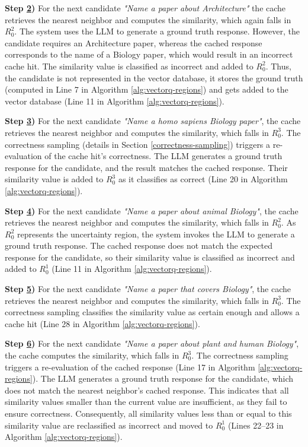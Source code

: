 \textbf{Step \hyperref[fig:vectorq-threshold-regions]{2})} For the next candidate \textit{"Name a paper about Architecture"} the cache retrieves the nearest neighbor and computes the similarity, which again falls in $R_0^2$. The system uses the LLM to generate a ground truth response. However, the candidate requires an Architecture paper, whereas the cached response corresponds to the name of a Biology paper, which would result in an incorrect cache hit. The similarity value is classified as incorrect and added to $R_0^2$. Thus, the candidate is not represented in the vector database, it stores the ground truth (computed in Line 7 in Algorithm \ref{alg:vectorq-regions}) and gets added to the vector database (Line 11 in Algorithm \ref{alg:vectorq-regions}). 

\textbf{Step \hyperref[fig:vectorq-threshold-regions]{3})} For the next candidate \textit{"Name a homo sapiens Biology paper"}, the cache retrieves the nearest neighbor and computes the similarity, which falls in $R_0^3$. The correctness sampling (details in Section \ref{correctness-sampling}) triggers a re-evaluation of the cache hit's correctness. The LLM generates a ground truth response for the candidate, and the result matches the cached response. Their similarity value is added to $R_0^3$ as it classifies as correct (Line 20 in Algorithm \ref{alg:vectorq-regions}).

\textbf{Step \hyperref[fig:vectorq-threshold-regions]{4})} For the next candidate \textit{"Name a paper about animal Biology"}, the cache retrieves the nearest neighbor and computes the similarity, which falls in $R_0^2$. As $R_0^2$ represents the uncertainty region, the system invokes the LLM to generate a ground truth response. The cached response does not match the expected response for the candidate, so their similarity value is classified as incorrect and added to $R_0^1$ (Line 11 in Algorithm \ref{alg:vectorq-regions}).

\textbf{Step \hyperref[fig:vectorq-threshold-regions]{5})} For the next candidate \textit{"Name a paper that covers Biology"}, the cache retrieves the nearest neighbor and computes the similarity, which falls in $R_0^3$. The correctness sampling classifies the similarity value as certain enough and allows a cache hit (Line 28 in Algorithm \ref{alg:vectorq-regions}). 

\textbf{Step \hyperref[fig:vectorq-threshold-regions]{6})} For the next candidate \textit{"Name a paper about plant and human Biology"}, the cache computes the similarity, which falls in $R_0^3$. The correctness sampling triggers a re-evaluation of the cached response (Line 17 in Algorithm \ref{alg:vectorq-regions}). The LLM generates a ground truth response for the candidate, which does not match the nearest neighbor's cached response. This indicates that all similarity values smaller than the current value are insufficient, as they fail to ensure correctness. Consequently, all similarity values less than or equal to this similarity value are reclassified as incorrect and moved to $R_0^1$ (Lines 22–23 in Algorithm \ref{alg:vectorq-regions}).\\

